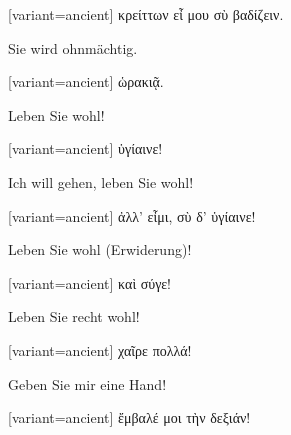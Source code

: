 \switchcolumn

\begin{greek}[variant=ancient]%
κρείττων εἶ μου σὺ βαδίζειν.

\end{greek}%
\switchcolumn*

Sie wird ohnmächtig.

\switchcolumn

\begin{greek}[variant=ancient]%
ὡρακιᾷ.

\end{greek}%
\indent Leben Sie wohl!

\switchcolumn

\begin{greek}[variant=ancient]%
ὑγίαινε!

\end{greek}%
\switchcolumn*

Ich will gehen, leben Sie wohl!

\switchcolumn

\begin{greek}[variant=ancient]%
ἀλλ' εἶμι, σὺ δ' ὑγίαινε!

\end{greek}%
\switchcolumn*

Leben Sie wohl (Erwiderung)!

\switchcolumn

\begin{greek}[variant=ancient]%
καὶ σύγε!

\end{greek}%
\switchcolumn*

Leben Sie recht wohl!

\switchcolumn

\begin{greek}[variant=ancient]%
χαῖρε πολλά!

\end{greek}%
\switchcolumn*

Geben Sie mir eine Hand!

\switchcolumn

\begin{greek}[variant=ancient]%
ἔμβαλέ μοι τὴν δεξιάν!

\end{greek}%
\switchcolumn*


